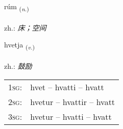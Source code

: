 \documentclass[frontgrid, backgrid]{flacards}\usepackage[]{graphicx}\usepackage[]{xcolor}
\begin{document}
\renewcommand{\blhead}{\vskip5pt {\small\bfseries\footnotesize Nafnorð | 名词 }}
\renewcommand{\bcfoot}{\vskip5pt \hspace{2pt}{\small\bfseries\footnotesize 1K}}


{rúm \small{\textsubscript{(\textit{n.})}} \\[1ex] %
\textphonetic{[ruːm]} \\
zh.: \emph{床；空间} \\  [2ex]
\renewcommand*{\arraystretch}{0.8}
}

\renewcommand{\flhead}{\vskip5pt \fboxsep=0pt {\small\bfseries\footnotesize Sagnorð | 动词}}
\renewcommand{\fcfoot}{\vskip5pt \fboxsep=0pt \hspace{2pt}{\small\bfseries\footnotesize 1K}}

\renewcommand{\blhead}{\vskip5pt {\small\bfseries\footnotesize Sagnorð | 动词 }}
\renewcommand{\bcfoot}{\vskip5pt \hspace{2pt}{\small\bfseries\footnotesize 1K}}


{hvetja \small{\textsubscript{(\textit{v.})}} \\[1ex] %
\textphonetic{[kʰvɛːtja]} \\
zh.: \emph{鼓励} \\  [2ex]
\renewcommand*{\arraystretch}{0.8}
\begin{tabular}{p{1cm}l}
\textsc{1sg}: & hvet -- hvatti -- hvatt \\ 
\textsc{2sg}: & hvetur -- hvattir -- hvatt \\ 
\textsc{3sg}: & hvetur -- hvatti -- hvatt \\ 
\end{tabular}
}

\renewcommand{\flhead}{\vskip5pt \fboxsep=0pt {\small\bfseries\footnotesize Sagnorð | 动词}}
\renewcommand{\fcfoot}{\vskip5pt \fboxsep=0pt \hspace{2pt}{\small\bfseries\footnotesize 1K}}
\end{document}
